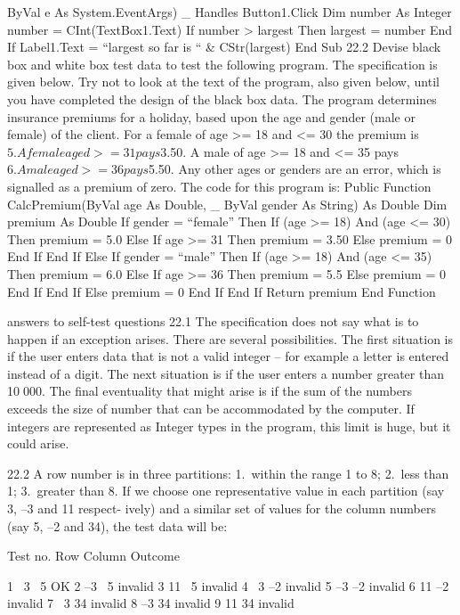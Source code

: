 			ByVal e As System.EventArgs) _
			Handles Button1.Click
	Dim number As Integer
	number = CInt(TextBox1.Text)
	If number > largest Then
		largest = number
	End If
	Label1.Text = “largest so far is “ & CStr(largest)
End Sub
22.2	Devise black box and white box test data to test the following program. The speciﬁcation is given below. Try not to look at the text of the program, also
given below, until you have completed the design of the black box data.
The program determines insurance premiums for a holiday, based upon the age and gender (male or female) of the client.
For a female of age >= 18 and <= 30 the premium is $5.
A female aged >= 31 pays $3.50.
A male of age >= 18 and <= 35 pays $6.
A male aged >= 36 pays $5.50.
Any other ages or genders are an error, which is signalled as a premium of zero.
	The code for this program is:
Public Function CalcPremium(ByVal age As Double, _
						ByVal gender As String) As Double
	Dim premium As Double
	If gender = “female” Then
		If (age >= 18) And (age <= 30) Then
			premium = 5.0
		Else
			If age >= 31 Then
				premium = 3.50
			Else
				premium = 0
			End If
		End If
	Else
		If gender = “male” Then
			If (age >= 18) And (age <= 35) Then
				premium = 6.0
			Else
				If age >= 36 Then
					premium = 5.5
				Else
					premium = 0
				End If
			End If
		Else
			premium = 0
		End If
	End If
	Return premium
End Function

answers to self-test questions
22.1	The speciﬁcation does not say what is to happen if an exception arises. There are several possibilities. The ﬁrst situation is if the user enters data that is not a valid integer – for example a letter is entered instead of a digit. The next situation is if the user enters a number greater than 10 000. The ﬁnal eventuality that might arise is if the sum of the numbers exceeds the size of number that can be accommodated by the computer. If integers are represented as Integer types in the program, this limit is huge, but it could arise.

22.2	A row number is in three partitions:
	1. within the range 1 to 8;
	2. less than 1;
	3. greater than 8.
	If we choose one representative value in each partition (say 3, –3 and 11 respect-
ively) and a similar set of values for the column numbers (say 5, –2 and 34), the test data will be:

Test no.	Row	Column	Outcome

1	 3	 5	OK
2	–3	 5	invalid
3	11	 5	invalid
4	 3	–2	invalid
5	–3	–2	invalid
6	11	–2	invalid
7	 3	34	invalid
8	–3	34	invalid
9	11	34	invalid


